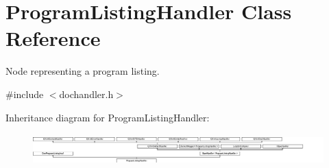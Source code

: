 \hypertarget{class_program_listing_handler}{}\section{Program\+Listing\+Handler Class Reference}
\label{class_program_listing_handler}


Node representing a program listing.  




{\ttfamily \#include $<$dochandler.\+h$>$}

Inheritance diagram for Program\+Listing\+Handler\+:\begin{figure}[H]
\begin{center}
\leavevmode
\includegraphics[height=1.226054cm]{class_program_listing_handler}
\end{center}
\end{figure}
